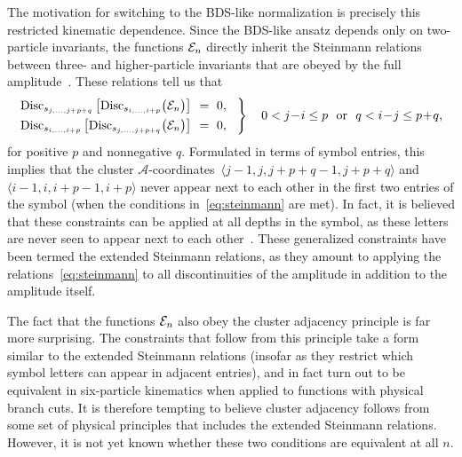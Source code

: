 \documentclass[12pt]{article}
\def\ket#1{\langle #1 \rangle}
\def\acoords{$\mathcal{A}$-coordinates}
\begin{document}
The motivation for switching to the BDS-like normalization is precisely this restricted kinematic dependence. Since the BDS-like ansatz depends only on two-particle invariants, the functions ${\cal E}_n$ directly inherit the Steinmann relations between three- and higher-particle invariants that are obeyed by the full amplitude~\cite{Steinmann,Steinmann2,Cahill:1973qp,Caron-Huot:2016owq,Dixon:2016nkn}. These relations tell us that
\begin{equation} \label{eq:steinmann}
\begin{rcases}
\text{Disc}_{s_{j,\dots,j+p+q}}\left[\text{Disc}_{s_{i,\dots,i+p}} \big({\cal E}_n \big) \right] &\!\!= \ 0, \hspace{.3cm} \\
\text{Disc}_{s_{i,\dots,i+p}}\left[\text{Disc}_{s_{j,\dots,j+p+q}} \big({\cal E}_n \big) \right] &\!\!= \ 0, 
\end{rcases} \quad 
\begin{gathered} 0 < j\!-\!i \leq p \text{\ \ or\ \ } q < i\!-\!j  \leq p\!+\!q, \end{gathered}
\end{equation}
for positive $p$ and nonnegative $q$. Formulated in terms of symbol entries, this implies that the cluster \acoords\ $\ket{j-1,j,j+p+q-1,j+p+q}$ and $\ket{i-1,i,i+p-1,i+p}$ never appear next to each other in the first two entries of the symbol (when the conditions in~\eqref{eq:steinmann} are met). In fact, it is believed that these constraints can be applied at all depths in the symbol, as these letters are never seen to appear next to each other~\cite{Caron-Huot:2016owq,Dixon:2016nkn,Caron-Huot:2018dsv,cosmic_galois_paper}. These generalized constraints have been termed the extended Steinmann relations, as they amount to applying the relations~\eqref{eq:steinmann} to all discontinuities of the amplitude in addition to the amplitude itself. 

The fact that the functions ${\cal E}_n$ also obey the cluster adjacency principle is far more surprising. The constraints that follow from this principle take a form similar to the extended Steinmann relations (insofar as they restrict which symbol letters can appear in adjacent entries), and in fact turn out to be equivalent in six-particle kinematics when applied to functions with physical branch cuts. It is therefore tempting to believe cluster adjacency follows from some set of physical principles that includes the extended Steinmann relations. However, it is not yet known whether these two conditions are equivalent at all $n$. 
\end{document}
